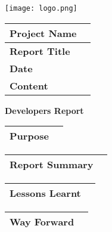 \documentclass[a4paper,12pt]{article}
\date{07/09/2016}
\author{Preshane Pillay}
\begin{document}
   \centering
      
	{\texttt{[image: logo.png]} \\

\vspace{1cm}
    
      \begin{tabular}{|p{3cm}|p{09cm}|}
	\hline
	{\bfseries Project Name} & {} \\
	\hline
	{\bfseries Report Title} & {} \\
	\hline
	{\bfseries Date} & {} \\
	\hline
	{\bfseries Content} & {} \\
	\hline
    \end{tabular}

\pagebreak    
    
\begin{Large}
	{\bfseries Developers Report} \\ 
\end{Large}
      \vspace{2cm}

      \begin{tabular}{|p{3cm}|p{09cm}|}
       \hline
       {\bfseries Purpose} & {} \\
       \hline
      \end{tabular}
      
    \vspace{2cm}

      \begin{tabular}{|p{3cm}|p{09cm}|}
       \hline
       {\bfseries Report Summary} & {} \\
       \hline
      \end{tabular}
      
     \vspace{2cm}
      
      \begin{tabular}{|p{3cm}|p{09cm}|}
       \hline
       {\bfseries Lessons Learnt} & {} \\
       \hline
      \end{tabular} 
      
      \vspace{2cm}
      }
      \begin{tabular}{|p{3cm}|p{09cm}|}
       \hline
       {\bfseries Way Forward} & {} \\
       \hline
      \end{tabular}
      
     
 
\end{document}
